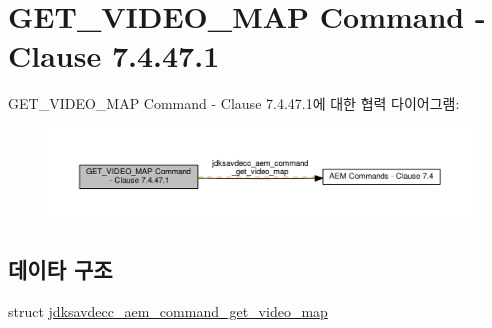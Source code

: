 \hypertarget{group__command__get__video__map}{}\section{G\+E\+T\+\_\+\+V\+I\+D\+E\+O\+\_\+\+M\+AP Command -\/ Clause 7.4.47.1}
\label{group__command__get__video__map}
G\+E\+T\+\_\+\+V\+I\+D\+E\+O\+\_\+\+M\+AP Command -\/ Clause 7.4.47.1에 대한 협력 다이어그램\+:
\nopagebreak
\begin{figure}[H]
\begin{center}
\leavevmode
\includegraphics[width=350pt]{group__command__get__video__map}
\end{center}
\end{figure}
\subsection*{데이타 구조}
\begin{DoxyCompactItemize}
\item 
struct \hyperlink{structjdksavdecc__aem__command__get__video__map}{jdksavdecc\+\_\+aem\+\_\+command\+\_\+get\+\_\+video\+\_\+map}
\end{DoxyCompactItemize}
